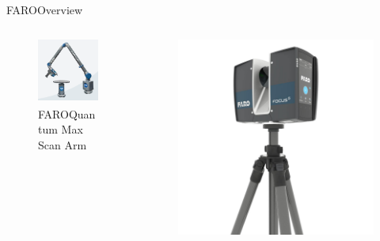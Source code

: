 \documentclass[10pt]{beamer}
\newcommand{\faro}[0]{FARO\textsuperscript{\textregistered}\space}
\begin{document}
\begin{frame}{\faro Overview}
\begin{columns}
\begin{column}{0.30\textwidth}
\begin{figure}
          \includegraphics[width=\textwidth]{images/faro_quantum_s_arm.png}
          \caption*{\faro Quantum Max \newline Scan Arm}
        \end{figure}
      \end{column}
      \begin{column}{0.30\textwidth}
        \begin{figure}
          \centering
          \includegraphics[width=\textwidth]{images/faro_scanner.jpg}

\end{figure}
\end{column}
\end{columns}
\end{frame}
\end{document}
